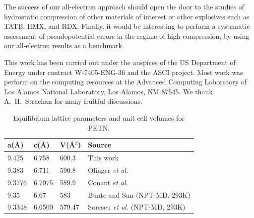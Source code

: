 \documentclass[prb,aps,nobibnotes,twocolumn,doublespace,twocolumngrid,superbib]{revtex4}
\begin{document}
The success of our all-electron approach should open the door to the studies
of hydrostatic compression of other materials of interest or other
explosives such as TATB, HMX, and RDX. 
Finally, it would be interesting to perform a systematic assessment of
pseudopotential errors in the regime of high compression, by using
our all-electron results as a benchmark.

\begin{acknowledgments}
This work has been carried out under the auspices of the US Department
of Energy under contract W-7405-ENG-36 and the ASCI project.  Most work 
was perform on the computing resources at the
Advanced Computing Laboratory of Los Alamos National Laboratory, Los
Alamos, NM 87545. 
We thank A.~H.~Strachan for many fruitful discussions.
\end{acknowledgments}




\begin{table}[p]
\begin{center}
\begin{tabular}{llll}
\hline\hline
a(\AA) & c(\AA) & V(\AA$^3$) & Source \\
\hline
9.425  & 6.758  &  600.3  & This work \\
9.383  & 6.711  &  590.8  & Olinger {\it et al.}\cite{Olinger_1975v62}\\
9.3776 & 6.7075 &  589.9  & Conant {\it et al.}\cite{Conant_1979} \\
9.35   & 6.67   &  583    & Bunte and Sun\cite{Bunte_2000v104} (NPT-MD, 293K) \\
9.3348 & 6.6500 &  579.47 & Sorescu {\it et al.}\cite{Sorescu_1999v103} (NPT-MD, 293K) \\
\hline\hline
\end{tabular}
\end{center}
\caption{Equilibrium lattice parameters and unit cell volumes for PETN.
}
\label{tab:table1}
\end{table}
\end{document}
